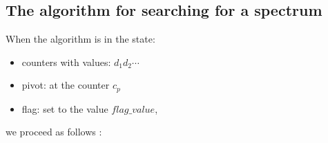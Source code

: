 \subsection{The algorithm for searching for a spectrum}
\label{the algorithm for searching the spectrum itself}
When the algorithm is in the state: 
\begin{itemize}
\item counters with values: $d_1d_2\cdots$
\item pivot: at the counter $c_p$
\item flag: set to the value $flag\_value$,
\end{itemize}
we proceed as follows 
:
